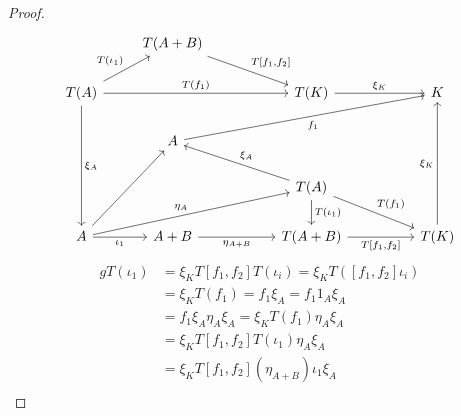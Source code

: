 \begin{subbox}{}
\begin{proof}
        \[
\begin{tikzcd}
                                                                         & T(A+B) \arrow[rrd, "{T[f_1,f_2]}"] &  &                                                                          &  &                           \\
T(A) \arrow[rrr, "T(f_1)"] \arrow[ru, "T(\iota_1)"] \arrow[ddd, "\xi_A"] &                                    &  & T(K) \arrow[rr, "\xi_K"]                                                 &  & K                         \\
                                                                         & A \arrow[rrrru, "f_1"']            &  &                                                                          &  &                           \\
                                                                         &                                    &  & T(A) \arrow[llu, "\xi_A"'] \arrow[rrd, "T(f_1)"] \arrow[d, "T(\iota_1)"] &  &                           \\
A \arrow[r, "\iota_1"'] \arrow[ruu] \arrow[rrru, "\eta_A"]               & A+B \arrow[rr, "\eta_{A+B}"']      &  & T(A+B) \arrow[rr, "{T[f_1,f_2]}"']                                       &  & T(K) \arrow[uuu, "\xi_K"]
\end{tikzcd}
\]
\begin{align*}
    gT(\iota_1) &= \xi_K T[f_1,f_2] T(\iota_i) = \xi_K T([f_1,f_2]\iota_i) \\[1.5ex]
    &= \xi_K T(f_1) = f_1 \xi_A = f_1 1_A \xi_A \\[1.5ex]
    &= f_1 \xi_A \eta_{A} \xi_A = \xi_K T(f_1) \eta_{A} \xi_A \\[1.5ex]
    &= \xi_K T[f_1,f_2] T(\iota_1) \eta_{A} \xi_A \\[1.5ex]
    &= \xi_K T[f_1,f_2] (\eta_{A+B}) \iota_1 \xi_A \\[1.5ex]

\end{align*}
\end{proof}
\end{subbox}
